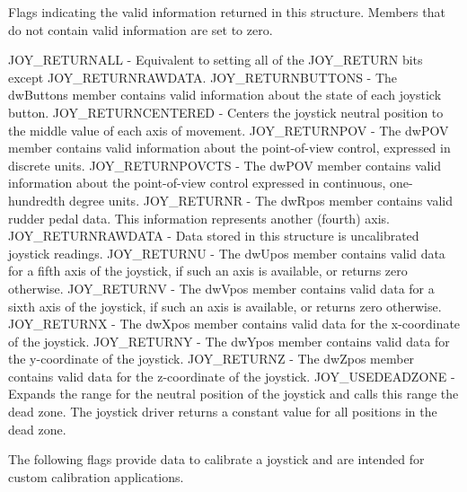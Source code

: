 Flags indicating the valid information returned in this structure. Members that do not contain valid information are set to zero. 

JOY\_\-RETURNALL -\/ Equivalent to setting all of the JOY\_\-RETURN bits except JOY\_\-RETURNRAWDATA. JOY\_\-RETURNBUTTONS -\/ The dwButtons member contains valid information about the state of each joystick button. JOY\_\-RETURNCENTERED -\/ Centers the joystick neutral position to the middle value of each axis of movement. JOY\_\-RETURNPOV -\/ The dwPOV member contains valid information about the point-\/of-\/view control, expressed in discrete units. JOY\_\-RETURNPOVCTS -\/ The dwPOV member contains valid information about the point-\/of-\/view control expressed in continuous, one-\/hundredth degree units. JOY\_\-RETURNR -\/ The dwRpos member contains valid rudder pedal data. This information represents another (fourth) axis. JOY\_\-RETURNRAWDATA -\/ Data stored in this structure is uncalibrated joystick readings. JOY\_\-RETURNU -\/ The dwUpos member contains valid data for a fifth axis of the joystick, if such an axis is available, or returns zero otherwise. JOY\_\-RETURNV -\/ The dwVpos member contains valid data for a sixth axis of the joystick, if such an axis is available, or returns zero otherwise. JOY\_\-RETURNX -\/ The dwXpos member contains valid data for the x-\/coordinate of the joystick. JOY\_\-RETURNY -\/ The dwYpos member contains valid data for the y-\/coordinate of the joystick. JOY\_\-RETURNZ -\/ The dwZpos member contains valid data for the z-\/coordinate of the joystick. JOY\_\-USEDEADZONE -\/ Expands the range for the neutral position of the joystick and calls this range the dead zone. The joystick driver returns a constant value for all positions in the dead zone. 

The following flags provide data to calibrate a joystick and are intended for custom calibration applications. 

